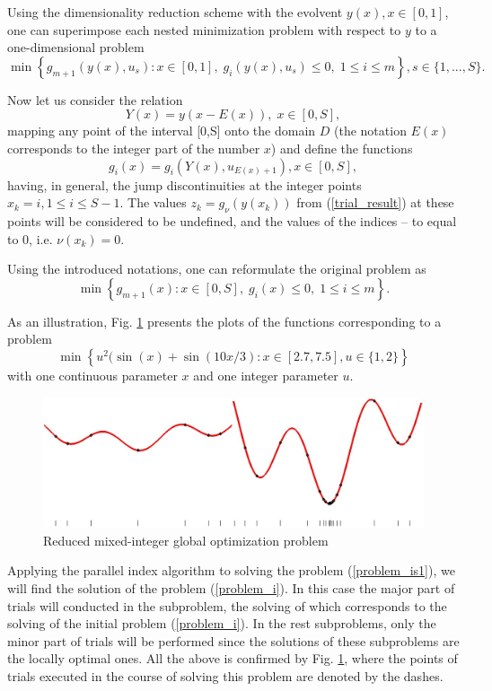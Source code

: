 \documentclass{llncs}
\begin{document}
Using the dimensionality reduction scheme with the evolvent $y(x), x\in [0,1]$, one can 
superimpose each nested minimization problem with respect to $y$ to a one-dimensional 
problem 
\[
 \min{\left\{ g_{m+1}(y(x),u_s):x \in [0,1], \; g_i(y(x),u_s)\leq 0, \; 1 \leq i \leq m\right\}}, 
s\in\{1,...,S\}.
\]

Now let us consider the relation 
\[
Y(x)=y(x-E(x)), \; x\in[0,S],
\]
mapping any point of the interval [0,S] onto the domain $D$ (the notation $E(x)$ corresponds 
to the integer part of the number $x$) and define the functions 
\[
g_i(x) = g_i(Y(x),u_{E(x)+1}), x\in[0,S],
\]
having, in general, the jump discontinuities at the integer points $x_k = i, 1\leq i \leq 
S-1$.
The values $z_k = g_\nu(y(x_k))$ from (\ref{trial_result}) at these points will be considered to 
be undefined, and the values of the indices -- to equal to 0, i.e. $\nu(x_k) = 0$.

Using the introduced notations, one can reformulate the original problem as
\begin{equation}\label{problem_is1}
\min \left\{g_{m+1}(x): x \in [0,S], \; g_i(x) \leq 0, \; 1 \leq i \leq m\right\}.
\end{equation}

As an illustration, Fig. \ref{fig:1} presents the plots of the functions corresponding to a 
problem 
\[
\min{\left\{ u^2 (\sin(x) +\sin(10x/3) : x\in [2.7, 7.5], u \in \{1,2\} \right\}}
\]
with one continuous parameter $x$ and one integer parameter $u$.

\begin{figure}[ht]
    \centering
    \includegraphics[width=1.0\textwidth] {fig1.jpg}
    \caption{Reduced mixed-integer global optimization problem}
    \label{fig:1}
\end{figure}

Applying the parallel index algorithm to solving the problem (\ref{problem_is1}), we will find 
the solution of the problem (\ref{problem_i}). In this case the major part of trials will conducted 
in 
the subproblem, the solving of which corresponds to the solving of the initial 
problem (\ref{problem_i}). In the rest subproblems, only the minor part of trials will be 
performed 
since the solutions of these subproblems are the locally optimal ones.
All the above is confirmed by Fig. \ref{fig:1}, where the  
points of trials executed in the course of solving this problem are denoted by the dashes.
\end{document}
